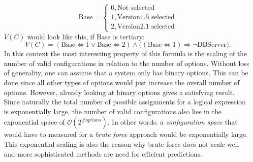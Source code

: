 \begin{equation*}
	\text{Base} =  \begin{cases}
		0, \text{Not selected}\\
		1, \text{Version1.5 selected}\\
		2, \text{Version2.1 selected}
	\end{cases}
\end{equation*}
$V(C)$ would look like this, if Base is tertiary:
\begin{equation*}
		V(C)= (\text{Base} \Leftrightarrow 1 \lor \text{Base} \Leftrightarrow 2) \land \big((\text{Base} \Leftrightarrow 1) \Rightarrow \neg \text{DBServer}\big).
\end{equation*}
\noindent
In this context the most interesting property of this formula is the scaling of the number of valid configurations in relation to the number of options. Without loss of generality, one can assume that a system only has binary options. This can be done since all other types of options would just increase the overall number of options. However, already looking at binary options gives a satisfying result. Since naturally the total number of possible assignments for a logical expression is exponentially large, the number of valid configurations also lies in the exponential space of $\mathcal{O}(2^{\#options})$. In other words: a \textit{configuration space} that would have to measured for a \textit{brute force} approach would be exponentially large. 
This exponential scaling is also the reason why brute-force does not scale well and more sophisticated methods are need for efficient predictions.


